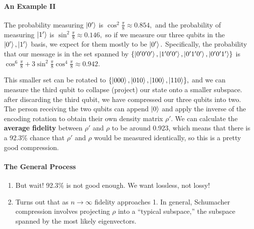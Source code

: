 \documentclass[12pt]{article}
\theoremstyle{remark}
\begin{document}
\paragraph{An Example II}
The probability measuring $\ket{0'}$ is $\cos^2\frac\pi 8\approx0.854,$ and the probability of measuring $\ket{1'}$ is $\sin^2\frac\pi 8\approx0.146,$ so if we measure our three qubits in the $\ket{0'},\ket{1'}$ basis, we expect for them mostly to be $\ket{0'}.$ Specifically, the probability that our message is in the set spanned by $\{\ket{0'0'0'},\ket{1'0'0'},\ket{0'1'0'},\ket{0'0'1'}\}$ is $\cos^6\frac\pi 8+3\sin^2\frac\pi 8\cos^4\frac\pi 8\approx0.942.$ 

This smaller set can be rotated to $\{\ket{000},\ket{010},\ket{100},\ket{110}\},$ and we can measure the third qubit to collapse (project) our state onto a smaller subspace. after discarding the third qubit, we have compressed our three qubits into two. The person receiving the two qubits can append $\ket{0}$ and apply the inverse of the encoding rotation to obtain their own density matrix $\rho'.$ We can calculate the \textbf{average fidelity} between $\rho'$ and $\rho$ to be around 0.923, which means that there is a 92.3\% chance that $\rho'$ and $\rho$ would be measured identically, so this is a pretty good compression.

\paragraph{The General Process}


\begin{enumerate}
    \item But wait! 92.3\% is not good enough. We want lossless, not lossy!
    \item Turns out that as $n\to\infty$ fidelity approaches 1. In general, Schumacher compression involves projecting $\rho$ into a ``typical subspace,'' the subspace spanned by the most likely eigenvectors.
\end{enumerate}
\end{document}

